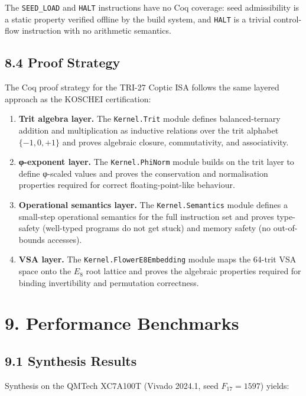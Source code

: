 The \texttt{SEED\_LOAD} and \texttt{HALT} instructions have no
Coq coverage: seed admissibility is a static property verified
offline by the build system, and \texttt{HALT} is a trivial
control-flow instruction with no arithmetic semantics.

\subsection{8.4 Proof Strategy}\label{fa_71:proof-strategy}

The Coq proof strategy for the TRI-27 Coptic ISA follows the
same layered approach as the KOSCHEI certification:

\begin{enumerate}
\def\labelenumi{L\arabic{enumi}.}
\item
  \textbf{Trit algebra layer.} The \texttt{Kernel.Trit} module
  defines balanced-ternary addition and multiplication as
  inductive relations over the trit alphabet \(\{-1, 0, +1\}\)
  and proves algebraic closure, commutativity, and associativity.
\item
  \textbf{φ-exponent layer.} The \texttt{Kernel.PhiNorm}
  module builds on the trit layer to define φ-scaled values and
  proves the conservation and normalisation properties required
  for correct floating-point-like behaviour.
\item
  \textbf{Operational semantics layer.} The
  \texttt{Kernel.Semantics} module defines a small-step
  operational semantics for the full instruction set and proves
  type-safety (well-typed programs do not get stuck) and memory
  safety (no out-of-bounds accesses).
\item
  \textbf{VSA layer.} The \texttt{Kernel.FlowerE8Embedding}
  module maps the 64-trit VSA space onto the $E_8$ root lattice
  and proves the algebraic properties required for binding
  invertibility and permutation correctness.
\end{enumerate}

\section{9. Performance Benchmarks}\label{fa_71:benchmarks}

\subsection{9.1 Synthesis Results}\label{fa_71:synthesis}

Synthesis on the QMTech XC7A100T (Vivado 2024.1, seed
\(F_{17}=1597\)) yields:

